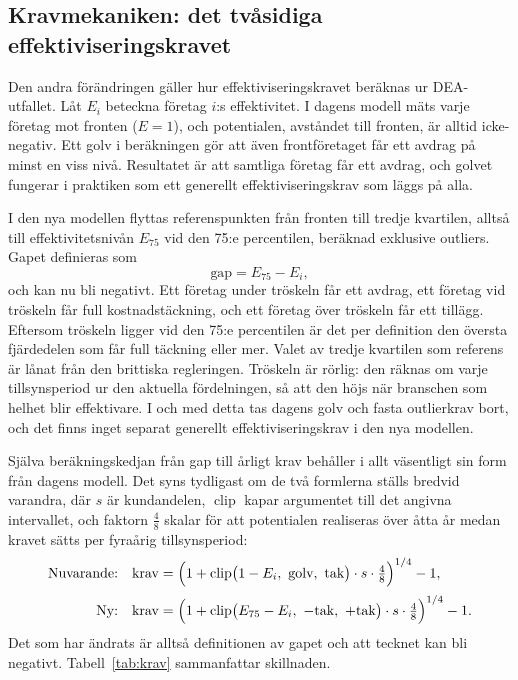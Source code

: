 \documentclass[11pt,a4paper]{article}
\DeclareMathOperator{\clip}{clip}
\begin{document}
\subsection{Kravmekaniken: det tvåsidiga effektiviseringskravet}

Den andra förändringen gäller hur effektiviseringskravet beräknas ur DEA-utfallet. Låt $E_i$
beteckna företag $i$:s effektivitet. I dagens modell mäts varje företag mot fronten ($E = 1$), och
potentialen, avståndet till fronten, är alltid icke-negativ. Ett golv i beräkningen gör att även
frontföretaget får ett avdrag på minst en viss nivå. Resultatet är att samtliga företag får ett
avdrag, och golvet fungerar i praktiken som ett generellt effektiviseringskrav som läggs på alla.

I den nya modellen flyttas referenspunkten från fronten till tredje kvartilen, alltså till
effektivitetsnivån $E_{75}$ vid den 75:e percentilen, beräknad exklusive outliers. Gapet definieras
som
\[
  \text{gap} = E_{75} - E_i,
\]
och kan nu bli negativt. Ett företag under tröskeln får ett avdrag, ett företag vid tröskeln får
full kostnadstäckning, och ett företag över tröskeln får ett tillägg. Eftersom tröskeln ligger vid
den 75:e percentilen är det per definition den översta fjärdedelen som får full täckning eller mer.
Valet av tredje kvartilen som referens är lånat från den brittiska regleringen. Tröskeln är
rörlig: den räknas om varje tillsynsperiod ur den aktuella fördelningen, så att den höjs när
branschen som helhet blir effektivare. I och med detta tas dagens golv och fasta outlierkrav bort,
och det finns inget separat generellt effektiviseringskrav i den nya modellen.

Själva beräkningskedjan från gap till årligt krav behåller i allt väsentligt sin form från dagens
modell. Det syns tydligast om de två formlerna ställs bredvid varandra, där $s$ är kundandelen,
$\clip$ kapar argumentet till det angivna intervallet, och faktorn $\tfrac{4}{8}$ skalar för att
potentialen realiseras över åtta år medan kravet sätts per fyraårig tillsynsperiod:
\begin{align*}
  \text{Nuvarande:} \quad
    & \text{krav} = \Bigl(1 + \clip\bigl(1 - E_i,\ \text{golv},\ \text{tak}\bigr)
      \cdot s \cdot \tfrac{4}{8}\Bigr)^{1/4} - 1, \\[2pt]
  \text{Ny:} \quad
    & \text{krav} = \Bigl(1 + \clip\bigl(E_{75} - E_i,\ -\text{tak},\ +\text{tak}\bigr)
      \cdot s \cdot \tfrac{4}{8}\Bigr)^{1/4} - 1.
\end{align*}
Det som har ändrats är alltså definitionen av gapet och att tecknet kan bli negativt. Tabell~\ref{tab:krav}
sammanfattar skillnaden.
\end{document}
